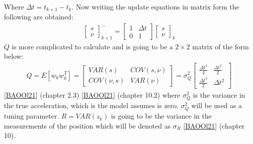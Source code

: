 \documentclass[letterpaper,10pt,english]{jupyterBook}
\begin{document}
\sphinxAtStartPar
Where \(\Delta t = t_{k+1} - t_k\). Now writing the update equations in matrix form the following are obtained:
\begin{equation}\label{equation:4ExampleVelocityFromPosition:velocity}
\begin{split}\begin{bmatrix} s \\ \nu \end{bmatrix}^-_{k+1} = \begin{bmatrix} 1 & \Delta t \\ 0 & 1 \end{bmatrix} \begin{bmatrix} s \\ \nu \end{bmatrix}_k\end{split}
\end{equation}
\sphinxAtStartPar
\(Q\) is more complicated to calculate and is going to be a \(2 \times 2\) matrix of the form below:
\begin{equation*}
\begin{split}Q = E[w_kw_k^T] =  \begin{bmatrix} VAR(s) & COV(s,\nu) \\ COV(\nu,s) & VAR(\nu) \end{bmatrix} = \sigma_Q^2 \begin{bmatrix} \frac{\Delta t^4}{4} & \frac{\Delta t^3}{2} \\ \frac{\Delta t^3}{2} & \Delta t^2 \end{bmatrix} \end{split}
\end{equation*}
\sphinxAtStartPar
{[}\hyperlink{cite.99Bibliography:id3}{BAOOl21}{]} (chapter 2.3) {[}\hyperlink{cite.99Bibliography:id3}{BAOOl21}{]} (chapter 10.2)
where \(\sigma_Q^2\) is the variance in the true acceleration, which is the model assumes is zero. \(\sigma_Q^2\) will be used as a tuning parameter.
\(R = VAR(z_k)\) is going to be the variance in the measurements of the position which will be denoted as \(\sigma_R\) {[}\hyperlink{cite.99Bibliography:id3}{BAOOl21}{]} (chapter 10).
\end{document}
